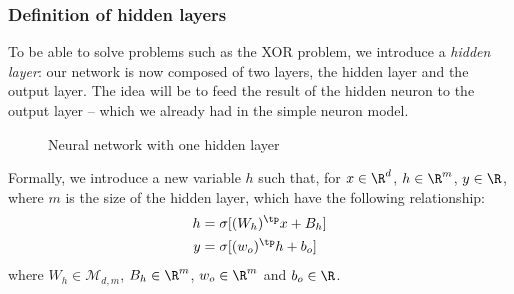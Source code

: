 \documentclass[toc, titlepaged]{../cs-classes/cs-classes}
\begin{document}
\subsubsection{Definition of hidden layers}
To be able to solve problems such as the XOR problem, we introduce a \emph{hidden layer}: our network is now composed of two layers, the hidden layer and the output layer. The idea will be to feed the result of the hidden neuron to the output layer -- which we already had in the simple neuron model.

\begin{figure}[H]
    \centering
    \caption{Neural network with one hidden layer}
\end{figure}

Formally, we introduce a new variable $h$ such that, for $x\in\R^d$, $h\in\R^m$, $y\in\R$, where $m$ is the size of the hidden layer, which have the following relationship:
\begin{equation*}
    \begin{aligned}
        h&=\sigma[(W_h)^\tp x +B_h]\\
        y&=\sigma[(w_o)^\tp h +b_o]
    \end{aligned}
\end{equation*}
where $W_h\in\mathscr{M}_{d, m}$, $B_h\in\R^m$, $w_o\in\R^m$ and $b_o\in\R$. 
\end{document}
